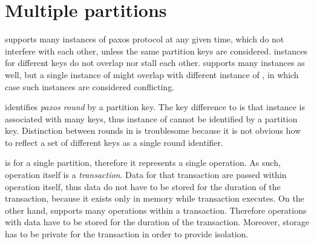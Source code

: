 
\section{Multiple partitions}\label{sec:mpp:requirements}


\lwt supports many instances of paxos protocol at any given time, which do not interfere with each other, unless the same partition keys are considered. \lwt instances for different keys do not overlap nor stall each other.
\mpt supports many instances as well, but a single instance of \mpt might overlap with different instance of \mpt, in which case such instances are considered conflicting. 

\lwt identifies \emph{paxos round} by a partition key. The key difference to \lwt is that \mpt instance is associated with many keys, thus instance of \mpt cannot be identified by a partition key. 
Distinction between \paxos rounds in \mpt is troublesome because it is not obvious how to reflect a set of different keys as a single round identifier.
\label{sec:mpp:requirements:identifyRound}

\lwt is for a single partition, therefore it represents a single operation. As such, operation itself is a
\emph{transaction}. Data for that transaction are passed within operation itself, thus data do not have to be stored
 for the duration of the transaction, because it exists only in memory while \lwt transaction executes.
On the other hand, \mpt supports many operations within a transaction. Therefore operations with data have to be stored for the duration of the transaction. Moreover, storage has to be private for the transaction in order to provide isolation.








